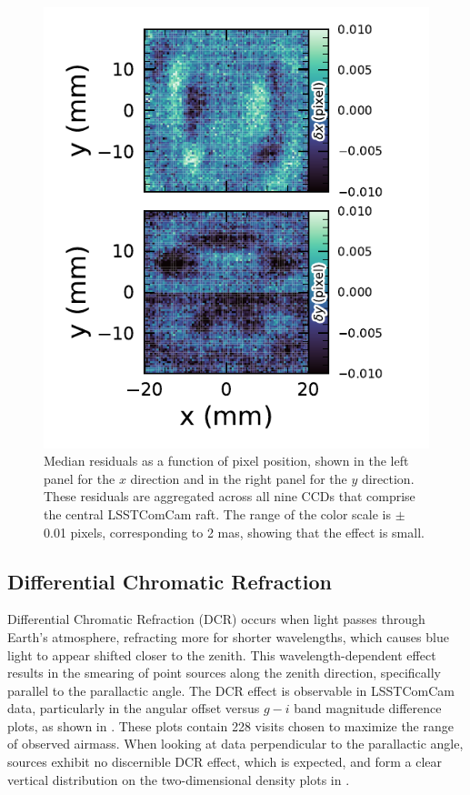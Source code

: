 \begin{figure}[htb!]
\includegraphics[width=\linewidth]{Astrometry_CCD}
\caption{Median residuals as a function of pixel position, shown in the left panel for the $x$ direction and in the right panel for the $y$ direction. 
These residuals are aggregated across all nine CCDs that comprise the central LSSTComCam raft.
The range of the color scale is $\pm$ 0.01 pixels, corresponding to 2 mas, showing that the effect is small.}
\label{fig:Astrometry_CCD}
\end{figure}

\subsection{Differential Chromatic Refraction}
\label{sec:differential_chromatic_refraction}
\gls{Differential Chromatic Refraction} (DCR) occurs when light passes through Earth’s atmosphere, refracting more for shorter wavelengths, which causes blue light to appear shifted closer to the zenith.
This wavelength-dependent effect results in the smearing of point sources along the zenith direction, specifically parallel to the parallactic angle.
The DCR effect is observable in LSSTComCam data, particularly in the angular offset versus $g-i$ band magnitude difference plots,  as shown in . 
These plots contain 228 visits chosen to maximize the range of observed airmass.
When looking at data perpendicular to the parallactic angle, sources exhibit no discernible DCR effect, which is expected, and form a clear vertical distribution on the two-dimensional density plots in .

